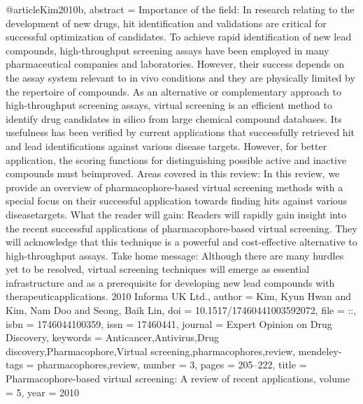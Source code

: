 @article{Kim2010b,
abstract = {Importance of the field: In research relating to the development of new drugs, hit identification and validations are critical for successful optimization of candidates. To achieve rapid identification of new lead compounds, high-throughput screening assays have been employed in many pharmaceutical companies and laboratories. However, their success depends on the assay system relevant to in vivo conditions and they are physically limited by the repertoire of compounds. As an alternative or complementary approach to high-throughput screening assays, virtual screening is an efficient method to identify drug candidates in silico from large chemical compound databases. Its usefulness has been verified by current applications that successfully retrieved hit and lead identifications against various disease targets. However, for better application, the scoring functions for distinguishing possible active and inactive compounds must beimproved. Areas covered in this review: In this review, we provide an overview of pharmacophore-based virtual screening methods with a special focus on their successful application towards finding hits against various diseasetargets. What the reader will gain: Readers will rapidly gain insight into the recent successful applications of pharmacophore-based virtual screening. They will acknowledge that this technique is a powerful and cost-effective alternative to high-throughput assays. Take home message: Although there are many hurdles yet to be resolved, virtual screening techniques will emerge as essential infrastructure and as a prerequisite for developing new lead compounds with therapeuticapplications. {\textcopyright} 2010 Informa UK Ltd.},
author = {Kim, Kyun Hwan and Kim, Nam Doo and Seong, Baik Lin},
doi = {10.1517/17460441003592072},
file = {::},
isbn = {1746044100359},
issn = {17460441},
journal = {Expert Opinion on Drug Discovery},
keywords = {Anticancer,Antivirus,Drug discovery,Pharmacophore,Virtual screening,pharmacophores,review},
mendeley-tags = {pharmacophores,review},
number = {3},
pages = {205--222},
title = {{Pharmacophore-based virtual screening: A review of recent applications}},
volume = {5},
year = {2010}
}
